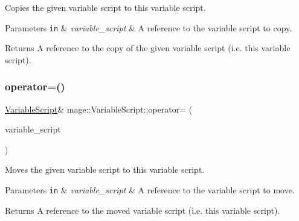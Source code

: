 Copies the given variable script to this variable script.


\begin{DoxyParams}[1]{Parameters}
\mbox{\tt in}  & {\em variable\+\_\+script} & A reference to the variable script to copy. \\
\hline
\end{DoxyParams}
\begin{DoxyReturn}{Returns}
A reference to the copy of the given variable script (i.\+e. this variable script). 
\end{DoxyReturn}
\hypertarget{classmage_1_1_variable_script_a4602887cc8b6c45a169af7822cf744a1}{}\label{classmage_1_1_variable_script_a4602887cc8b6c45a169af7822cf744a1} 
\subsubsection{\texorpdfstring{operator=()}{operator=()}\hspace{0.1cm}{\footnotesize\ttfamily [2/2]}}
{\footnotesize\ttfamily \hyperlink{classmage_1_1_variable_script}{Variable\+Script}\& mage\+::\+Variable\+Script\+::operator= (\begin{DoxyParamCaption}\item[{\hyperlink{classmage_1_1_variable_script}{Variable\+Script} \&\&}]{variable\+\_\+script }\end{DoxyParamCaption})\hspace{0.3cm}{\ttfamily [delete]}}

Moves the given variable script to this variable script.


\begin{DoxyParams}[1]{Parameters}
\mbox{\tt in}  & {\em variable\+\_\+script} & A reference to the variable script to move. \\
\hline
\end{DoxyParams}
\begin{DoxyReturn}{Returns}
A reference to the moved variable script (i.\+e. this variable script). 
\end{DoxyReturn}
\hypertarget{classmage_1_1_variable_script_af83059a4ce77ebd1ae042707d0acf750}{}\label{classmage_1_1_variable_script_af83059a4ce77ebd1ae042707d0acf750} 
